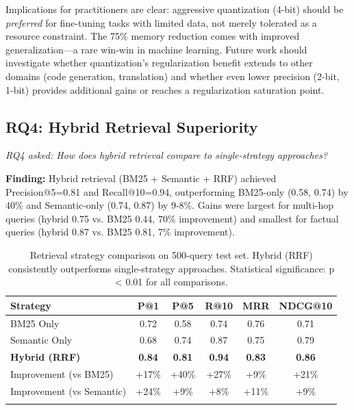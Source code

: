 \documentclass[pdflatex,sn-basic]{sn-jnl}
\begin{document}
Implications for practitioners are clear: aggressive quantization (4-bit) should be \textit{preferred} for fine-tuning tasks with limited data, not merely tolerated as a resource constraint. The 75\% memory reduction comes with improved generalization—a rare win-win in machine learning. Future work should investigate whether quantization's regularization benefit extends to other domains (code generation, translation) and whether even lower precision (2-bit, 1-bit) provides additional gains or reaches a regularization saturation point.

\subsection{RQ4: Hybrid Retrieval Superiority}
\label{sec:results-rq4}

\textit{RQ4 asked: How does hybrid retrieval compare to single-strategy approaches?}

\textbf{Finding:} Hybrid retrieval (BM25 + Semantic + RRF) achieved Precision@5=0.81 and Recall@10=0.94, outperforming BM25-only (0.58, 0.74) by 40\% and Semantic-only (0.74, 0.87) by 9-8\%. Gains were largest for multi-hop queries (hybrid 0.75 vs. BM25 0.44, 70\% improvement) and smallest for factual queries (hybrid 0.87 vs. BM25 0.81, 7\% improvement).

\begin{table}[tb]
    \caption{Retrieval strategy comparison on 500-query test set. Hybrid (RRF) consistently outperforms single-strategy approaches. Statistical significance: p < 0.01 for all comparisons.}
    \label{tab:retrieval-comparison}
    \centering
    \small
    \begin{tabular}{lccccc}
        \toprule
        \textbf{Strategy} & \textbf{P@1} & \textbf{P@5} & \textbf{R@10} & \textbf{MRR} & \textbf{NDCG@10} \\
        \midrule
        BM25 Only & 0.72 & 0.58 & 0.74 & 0.76 & 0.71 \\
        Semantic Only & 0.68 & 0.74 & 0.87 & 0.75 & 0.79 \\
        \textbf{Hybrid (RRF)} & \textbf{0.84} & \textbf{0.81} & \textbf{0.94} & \textbf{0.83} & \textbf{0.86} \\
        \midrule
        Improvement (vs BM25) & +17\% & +40\% & +27\% & +9\% & +21\% \\
        Improvement (vs Semantic) & +24\% & +9\% & +8\% & +11\% & +9\% \\
        \botrule
    \end{tabular}
\end{table}
\end{document}
